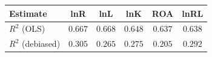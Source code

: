 \begin{tabular}{l*{5}{c}}
\hline\hline
 Estimate & lnR & lnL & lnK & ROA & lnRL \\
\hline
\addlinespace $ R^2$ (OLS) & $0.667$ & $0.668$ & $0.648$ & $0.637$ & $0.638$ \\
$ R^2$ (debiased) & $0.305$ & $0.265$ & $0.275$ & $0.205$ & $0.292$ \\
\hline\hline
\end{tabular}
